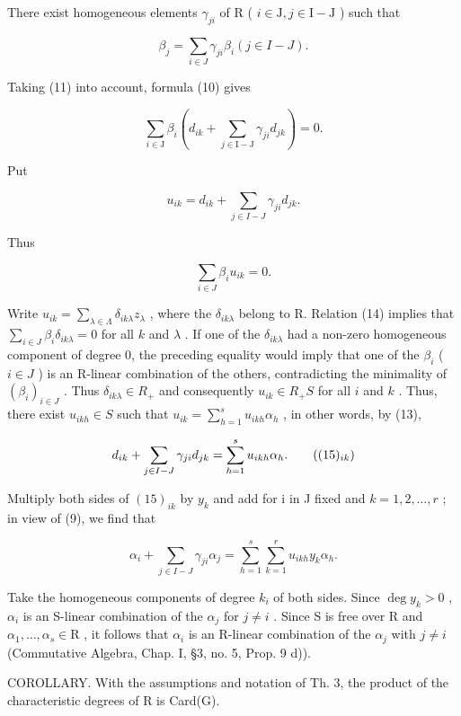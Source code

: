 There exist homogeneous elements \(\gamma_{ji}\) of R ( \(i \in \mathrm{J}, j \in \mathrm{I} - \mathrm{J}\) ) such that

\[
\beta_ {j} = \sum_ {i \in J} \gamma_ {j i} \beta_ {i} (j \in I - J).\tag{11}
\]

Taking (11) into account, formula (10) gives

\[
\sum_ {i \in \mathrm{J}} \beta_ {i} \left(d _ {i k} + \sum_ {j \in \mathrm{I} - \mathrm{J}} \gamma_ {j i} d _ {j k}\right) = 0.\tag{12}
\]

Put

\[
u _ {i k} = d _ {i k} + \sum_ {j \in I - J} \gamma_ {j i} d _ {j k}.\tag{13}
\]

Thus

\[
\sum_ {i \in J} \beta_ {i} u _ {i k} = 0.\tag{14}
\]

Write \(u_{ik} = \sum_{\lambda \in \Lambda} \delta_{ik\lambda} z_\lambda\) , where the \(\delta_{ik\lambda}\) belong to R. Relation (14) implies that \(\sum_{i \in J} \beta_i \delta_{ik\lambda} = 0\) for all \(k\) and \(\lambda\) . If one of the \(\delta_{ik\lambda}\) had a non-zero homogeneous component of degree 0, the preceding equality would imply that one of the \(\beta_i\) ( \(i \in J\) ) is an R-linear combination of the others, contradicting the minimality of \((\beta_i)_{i \in J}\) . Thus \(\delta_{ik\lambda} \in R_+\) and consequently \(u_{ik} \in R_+ S\) for all \(i\) and \(k\) . Thus, there exist \(u_{ikh} \in S\) such that \(u_{ik} = \sum_{h=1}^{s} u_{ikh} \alpha_h\) , in other words, by (13),

\[
d _ {i k} + \sum_ {j \in I - J} \gamma_ {j i} d _ {j k} = \sum_ {h = 1} ^ {s} u _ {i k h} \alpha_ {h}.\tag{$(15)_{ik}$}
\]

Multiply both sides of \((15)_{ik}\) by \(y_{k}\) and add for i in J fixed and \(k = 1, 2, \ldots, r\) ; in view of (9), we find that

\[
\alpha_ {i} + \sum_ {j \in I - J} \gamma_ {j i} \alpha_ {j} = \sum_ {h = 1} ^ {s} \sum_ {k = 1} ^ {r} u _ {i k h} y _ {k} \alpha_ {h}.
\]

Take the homogeneous components of degree \(k_i\) of both sides. Since \(\deg y_k > 0\) , \(\alpha_i\) is an S-linear combination of the \(\alpha_j\) for \(j \neq i\) . Since S is free over R and \(\alpha_1, \ldots, \alpha_s \in \mathrm{R}\) , it follows that \(\alpha_i\) is an R-linear combination of the \(\alpha_j\) with \(j \neq i\) (Commutative Algebra, Chap. I, §3, no. 5, Prop. 9 d)).

COROLLARY. With the assumptions and notation of Th. 3, the product of the characteristic degrees of R is Card(G).

